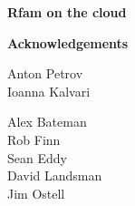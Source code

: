 \documentclass[landscape]{slides}
\begin{document}
\begin{slide}
\begin{center}
\textbf{Rfam on the cloud}

\vfill
\end{center}
\end{slide}
\begin{slide}

\large
\begin{center}
\large{\textbf{Acknowledgements}} \\

\normalsize
\vspace{0.5in}

Anton Petrov \\
Ioanna Kalvari \\

\vspace{0.5in}

Alex Bateman \\
Rob Finn \\
Sean Eddy \\
David Landsman \\
Jim Ostell

\end{center}

\vfill
\end{slide}
\end{document}
